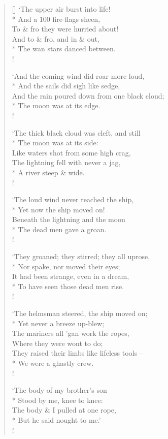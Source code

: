 \documentclass[MAIN]{subfiles}
\begin{document}
\begin{verse}[\versewidth]
`The upper air burst into life!\\*
\vin And a 100 fire-flags sheen,\\
To \& fro they were hurried about!\\
And to \& fro, and in \& out,\\*
\vin The wan stars danced between.\\!

`And the coming wind did roar more loud,\\*
\vin And the sails did sigh like sedge,\\
And the rain poured down from one black cloud;\\*
\vin The moon was at its edge.\\!

`The thick black cloud was cleft, and still\\*
\vin The moon was at its side:\\
Like waters shot from some high crag,\\
The lightning fell with never a jag,\\*
\vin A river steep \& wide.\\!

`The loud wind never reached the ship,\\*
\vin Yet now the ship moved on!\\
Beneath the lightning and the moon\\*
\vin The dead men gave a groan.\\!

`They groaned; they stirred; they all uprose,\\*
\vin Nor spake, nor moved their eyes;\\
It had been strange, even in a dream,\\*
\vin To have seen those dead men rise.\\!

`The helmsman steered, the ship moved on;\\*
\vin Yet never a breeze up-blew;\\
The mariners all 'gan work the ropes,\\
\vin Where they were wont to do;\\
They raised their limbs like lifeless tools --\\*
\vin We were a ghastly crew.\\!

`The body of my brother's son\\*
\vin Stood by me, knee to knee:\\
The body \& I pulled at one rope,\\* 
\vin But he said nought to me.'\\!


\end{verse}
\end{document}
